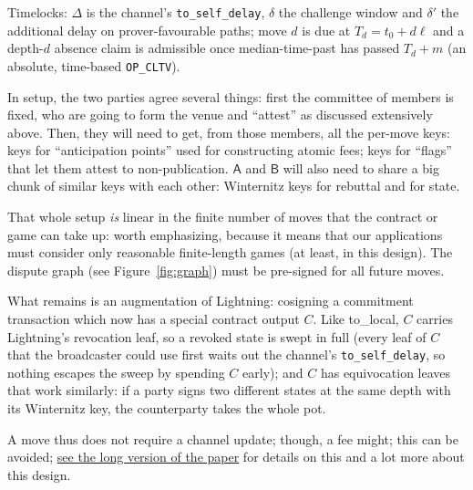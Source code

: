 \documentclass[11pt]{article}
\newcommand{\op}[1]{\texttt{OP\_#1}}
\newcommand{\Pa}{\mathsf{A}}
\newcommand{\Pb}{\mathsf{B}}
\newcommand{\tsd}{\Delta}
\newcommand{\dl}{\delta}
\newcommand{\dlp}{\delta'}
\begin{document}
Timelocks: $\tsd$ is the channel's \texttt{to\_self\_delay}, $\dl$ the challenge window and $\dlp$ the additional delay on prover-favourable paths; move $d$ is due at $T_d = t_0 + d\ell$ and a depth-$d$ absence claim is admissible once median-time-past has passed $T_d + m$ (an absolute, time-based \op{CLTV}).

In setup, the two parties agree several things: first the committee of members is fixed, who are going to form the venue and ``attest'' as discussed extensively above. Then, they will need to get, from those members, all the per-move keys: keys for ``anticipation points'' used for constructing atomic fees; keys for ``flags'' that let them attest to non-publication. $\Pa$ and $\Pb$ will also need to share a big chunk of similar keys with each other: Winternitz keys for rebuttal and for state.

That whole setup \emph{is} linear in the finite number of moves that the contract or game can take up: worth emphasizing, because it means that our applications must consider only reasonable finite-length games (at least, in this design). The dispute graph (see Figure~\ref{fig:graph}) must be pre-signed for all future moves.

What remains is an augmentation of Lightning: cosigning a commitment transaction which now has a special contract output $C$. Like to\_local, $C$ carries Lightning's revocation leaf, so a revoked state is swept in full (every leaf of $C$ that the broadcaster could use first waits out the channel's \texttt{to\_self\_delay}, so nothing escapes the sweep by spending $C$ early); and $C$ has equivocation leaves that work similarly: if a party signs two different states at the same depth with its Winternitz key, the counterparty takes the whole pot.

A move thus does not require a channel update; though, a fee might; this can be avoided; \underline{see the long version of the paper} for details on this and a lot more about this design.
\end{document}
